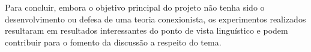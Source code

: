Para concluir, embora o objetivo principal do projeto não tenha sido o desenvolvimento ou defesa de uma teoria conexionista, os experimentos realizados resultaram em resultados interessantes do ponto de vista linguístico e podem contribuir para o fomento da discussão a respeito do tema.








